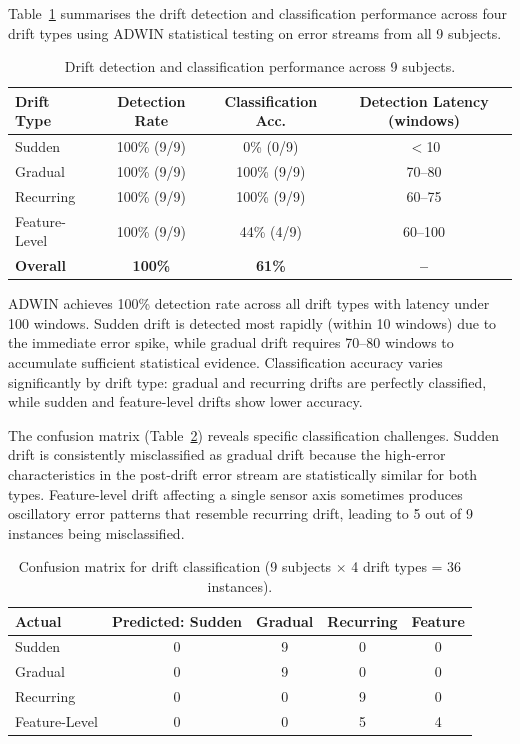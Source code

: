 Table~\ref{tab:drift_detection} summarises the drift detection and classification performance across four drift types using ADWIN statistical testing on error streams from all 9 subjects.

\begin{table}[ht]
\centering
\caption{Drift detection and classification performance across 9 subjects.}
\label{tab:drift_detection}
\begin{tabular}{lccc}
\toprule
\textbf{Drift Type} & \textbf{Detection Rate} &
\textbf{Classification Acc.} & \textbf{Detection Latency (windows)} \\
\midrule
Sudden       & 100\% (9/9) & 0\% (0/9) & $<$10   \\
Gradual      & 100\% (9/9) & 100\% (9/9) & 70--80  \\
Recurring    & 100\% (9/9) & 100\% (9/9) & 60--75  \\
Feature-Level& 100\% (9/9) & 44\% (4/9) & 60--100  \\
\midrule
\textbf{Overall} & \textbf{100\%} & \textbf{61\%} & \textbf{--} \\
\bottomrule
\end{tabular}
\end{table}

ADWIN achieves 100\% detection rate across all drift types with latency under 100 windows. Sudden drift is detected most rapidly (within 10 windows) due to the immediate error spike, while gradual drift requires 70--80 windows to accumulate sufficient statistical evidence. Classification accuracy varies significantly by drift type: gradual and recurring drifts are perfectly classified, while sudden and feature-level drifts show lower accuracy.

The confusion matrix (Table~\ref{tab:confusion}) reveals specific classification challenges. Sudden drift is consistently misclassified as gradual drift because the high-error characteristics in the post-drift error stream are statistically similar for both types. Feature-level drift affecting a single sensor axis sometimes produces oscillatory error patterns that resemble recurring drift, leading to 5 out of 9 instances being misclassified.

\begin{table}[ht]
\centering
\caption{Confusion matrix for drift classification (9 subjects $\times$ 4 drift types = 36 instances).}
\label{tab:confusion}
\begin{tabular}{lcccc}
\toprule
\textbf{Actual} & \textbf{Predicted: Sudden} & \textbf{Gradual} & \textbf{Recurring} & \textbf{Feature} \\
\midrule
Sudden       & 0  & 9  & 0 & 0 \\
Gradual      & 0  & 9  & 0 & 0 \\
Recurring    & 0  & 0  & 9 & 0 \\
Feature-Level& 0  & 0  & 5 & 4 \\
\bottomrule
\end{tabular}
\end{table}

